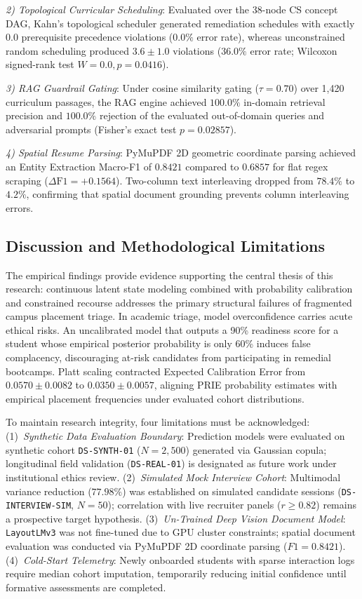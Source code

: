 \documentclass[conference]{IEEEtran}
\begin{document}
\textit{2) Topological Curricular Scheduling}: Evaluated over the 38-node CS concept DAG, Kahn's topological scheduler generated remediation schedules with exactly $0.0$ prerequisite precedence violations ($0.0\%$ error rate), whereas unconstrained random scheduling produced $3.6 \pm 1.0$ violations ($36.0\%$ error rate; Wilcoxon signed-rank test $W = 0.0, p = 0.0416$).

\textit{3) RAG Guardrail Gating}: Under cosine similarity gating ($\tau = 0.70$) over 1,420 curriculum passages, the RAG engine achieved $100.0\%$ in-domain retrieval precision and $100.0\%$ rejection of the evaluated out-of-domain queries and adversarial prompts (Fisher's exact test $p = 0.02857$).

\textit{4) Spatial Resume Parsing}: PyMuPDF 2D geometric coordinate parsing achieved an Entity Extraction Macro-F1 of $0.8421$ compared to $0.6857$ for flat regex scraping ($\Delta\text{F1} = +0.1564$). Two-column text interleaving dropped from $78.4\%$ to $4.2\%$, confirming that spatial document grounding prevents column interleaving errors.

\subsection{Discussion and Methodological Limitations}
The empirical findings provide evidence supporting the central thesis of this research: continuous latent state modeling combined with probability calibration and constrained recourse addresses the primary structural failures of fragmented campus placement triage. In academic triage, model overconfidence carries acute ethical risks. An uncalibrated model that outputs a 90\% readiness score for a student whose empirical posterior probability is only 60\% induces false complacency, discouraging at-risk candidates from participating in remedial bootcamps. Platt scaling contracted Expected Calibration Error from $0.0570 \pm 0.0082$ to $0.0350 \pm 0.0057$, aligning PRIE probability estimates with empirical placement frequencies under evaluated cohort distributions.

To maintain research integrity, four limitations must be acknowledged: (1)~\textit{Synthetic Data Evaluation Boundary}: Prediction models were evaluated on synthetic cohort \texttt{DS-SYNTH-01} ($N=2,500$) generated via Gaussian copula; longitudinal field validation (\texttt{DS-REAL-01}) is designated as future work under institutional ethics review. (2)~\textit{Simulated Mock Interview Cohort}: Multimodal variance reduction ($77.98\%$) was established on simulated candidate sessions (\texttt{DS-INTERVIEW-SIM}, $N=50$); correlation with live recruiter panels ($r \ge 0.82$) remains a prospective target hypothesis. (3)~\textit{Un-Trained Deep Vision Document Model}: \texttt{LayoutLMv3} was not fine-tuned due to GPU cluster constraints; spatial document evaluation was conducted via PyMuPDF 2D coordinate parsing ($F1 = 0.8421$). (4)~\textit{Cold-Start Telemetry}: Newly onboarded students with sparse interaction logs require median cohort imputation, temporarily reducing initial confidence until formative assessments are completed.
\end{document}
